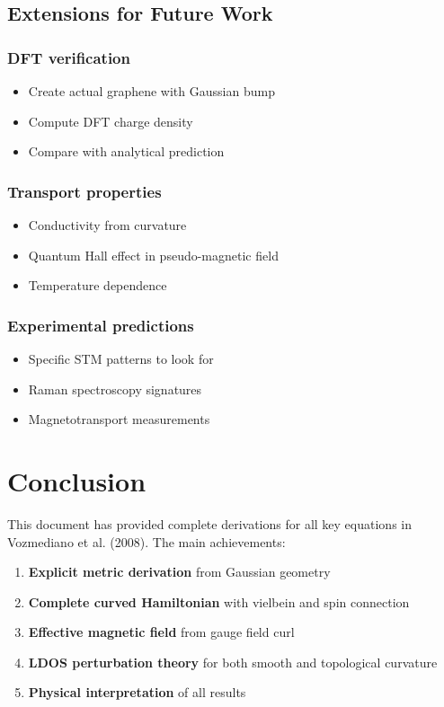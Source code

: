 \documentclass[12pt]{article}
\begin{document}
\subsection{Extensions for Future Work}

\subsubsection{DFT verification}
\begin{itemize}
    \item Create actual graphene with Gaussian bump
    \item Compute DFT charge density
    \item Compare with analytical prediction
\end{itemize}

\subsubsection{Transport properties}
\begin{itemize}
    \item Conductivity from curvature
    \item Quantum Hall effect in pseudo-magnetic field
    \item Temperature dependence
\end{itemize}

\subsubsection{Experimental predictions}
\begin{itemize}
    \item Specific STM patterns to look for
    \item Raman spectroscopy signatures
    \item Magnetotransport measurements
\end{itemize}

\section{Conclusion}

This document has provided complete derivations for all key equations in Vozmediano et al. (2008). The main achievements:

\begin{enumerate}
    \item \textbf{Explicit metric derivation} from Gaussian geometry
    \item \textbf{Complete curved Hamiltonian} with vielbein and spin connection
    \item \textbf{Effective magnetic field} from gauge field curl
    \item \textbf{LDOS perturbation theory} for both smooth and topological curvature
    \item \textbf{Physical interpretation} of all results
\end{enumerate}
\end{document}
